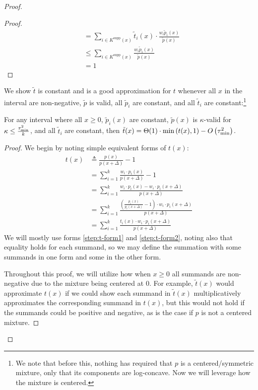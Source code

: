 \begin{proof}
\begin{proof}
\begin{align*}
        & = \sum_{i \in K^{\textrm{supp}}(x)} \tilde{t}_i(x) \cdot \frac{w_i \tilde{p}_i(x)}{\tilde{p}(x)}\\
        & \le \sum_{i \in K^{\textrm{supp}}(x)} \frac{w_i \tilde{p}_i(x)}{\tilde{p}(x)} \\
        & = 1
    \end{align*}
\end{proof}
We show $\tilde{t}$ is constant and is a good approximation for $t$ %
whenever all $x$ in the interval are non-negative, $\tilde{p}$ is valid, all $\tilde{p}_i$ are constant, and all $\tilde{t}_i$ are constant:\footnote{
We note that before this, nothing has required that $p$ is a centered/symmetric mixture, only that its components are log-concave.
Now we will leverage how the mixture is centered.}
\begin{claim}\label{claim:good-t-tilde}
    For any interval where all $x \ge 0$, $\tilde{p}_i(x)$ are constant, $\tilde{p}(x)$ is $\kappa$-valid for $\kappa \le \frac{\tau_{\textrm{min}}^2}{k}$, and all $\tilde{t}_i$ are constant, then $\tilde{t}(x) = \Theta(1) \cdot \min\left(t(x), 1\right) - O\left(\tau_{\textrm{min}}^2\right)$.

\end{claim}
\begin{proof}
    We begin by noting simple equivalent forms of $t(x)$:
    \begin{align}
        t(x) & \triangleq \frac{p(x)}{p(x + \Delta)} - 1 \nonumber \\
        & = \sum_{i=1}^k \frac{w_i \cdot p_i(x)}{p(x+\Delta)} - 1 \nonumber \\
        & = \sum_{i=1}^k \frac{w_i \cdot p_i(x) - w_i \cdot p_i(x+\Delta)}{p(x+\Delta)} \label{step:t-form1}\\
        & = \sum_{i=1}^k \frac{\left( \frac{p_i(x)}{p_i(x+\Delta)} - 1\right) \cdot  w_i \cdot p_i(x+\Delta)}{p(x+\Delta)}\nonumber  \\
        & = \sum_{i=1}^k \frac{t_i(x) \cdot  w_i \cdot p_i(x+\Delta)}{p(x+\Delta)} \label{step:t-form2}
    \end{align}
    We will mostly use forms \cref{step:t-form1} and \cref{step:t-form2}, noting also that equality holds for each summand, so we may define the summation with some summands in one form and some in the other form.

 Throughout this proof, we will utilize how when $x\ge 0$ all summands are non-negative due to the mixture being centered at $0$.
 For example, $\tilde{t}(x)$ would approximate $t(x)$ if we could show each summand in $\tilde{t}(x)$ multiplicatively approximates the corresponding summand in $t(x)$, but this would not hold if the summands could be positive and negative, as is the case if $p$ is not a centered mixture.


\end{proof}
\end{proof}
